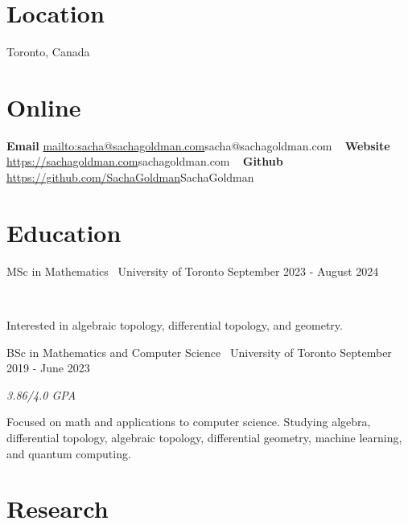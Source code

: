 \documentclass[]{style}
\begin{document}

\begin{aside}
\section{Location}
Toronto, Canada
\section{Online}
\textbf{Email}
\url{mailto:sacha@sachagoldman.com}{sacha@sachagoldman.com} 
~ \vspace{-2mm}
\textbf{Website} 
\url{https://sachagoldman.com}{sachagoldman.com} 
~ \vspace{-2mm}
\textbf{Github}
\url{https://github.com/SachaGoldman}{SachaGoldman}
\end{aside}

\section{Education}

\begin{entrylist}

\vspace{1mm}

\entry
{MSc in Mathematics \ {\normalfont University of Toronto}}
{September 2023 - August 2024}
{  ~ \vspace{-2.5mm}

Interested in algebraic topology, differential topology, and geometry. 
}

\entry
{BSc in Mathematics and Computer Science \ {\normalfont University of Toronto}}
{September 2019 - June 2023}
{\emph{3.86/4.0 GPA}
~ \vspace{1mm}

Focused on math and applications to computer science. Studying algebra, differential topology, algebraic topology, differential geometry, machine learning, and quantum computing.
}

\end{entrylist}

\section{Research}
\end{document}
